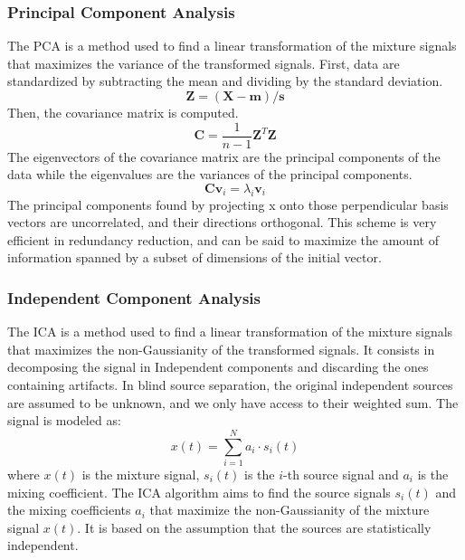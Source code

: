 \documentclass[a4paper]{sapthesis}
\begin{document}
\subsubsection{Principal Component Analysis}
The PCA\cite{pca} is a method used to find a linear transformation of the
mixture signals that maximizes the variance of the transformed signals. 
First, data are standardized by subtracting the mean and dividing by the
standard deviation.
\begin{equation}
\label{eq:pca}
\textbf{Z} = (\textbf{X} - \textbf{m})/\textbf{s}
\end{equation}
Then, the covariance matrix is computed. 
\begin{equation}
\label{eq:pca2}
\textbf{C} = \frac{1}{n-1}\textbf{Z}^T\textbf{Z}
\end{equation}
The eigenvectors of the covariance matrix are the principal components of the data while the
eigenvalues are the variances of the principal components.
\begin{equation}
\label{eq:pca3}
\textbf{C}\textbf{v}_i = \lambda_i\textbf{v}_i
\end{equation}
The principal components found by projecting x onto those
 perpendicular basis vectors are uncorrelated, and their directions 
 orthogonal. This scheme is very efficient in redundancy reduction,
  and can be said to maximize the amount of information spanned by a
subset of dimensions of the initial vector. \newline

\subsubsection{Independent Component Analysis}
The ICA\cite{ica} is a method used to find a linear transformation of the
mixture signals that maximizes the non-Gaussianity of the transformed signals.
It consists in decomposing the signal in Independent components and 
discarding the ones containing artifacts. In blind source separation, the original independent
sources are assumed to be unknown, and we only have
access to their weighted sum.\cite{ica2} \newline
The signal is modeled as:
\begin{equation}
\label{eq:ica}
x(t) = \sum_{i=1}^{N} a_i \cdot s_i(t)
\end{equation}
where $x(t)$ is the mixture signal, $s_i(t)$ is the $i$-th source signal
and $a_i$ is the mixing coefficient. \newline
The ICA algorithm aims to find the source signals $s_i(t)$ and the mixing
coefficients $a_i$ that maximize the non-Gaussianity of the mixture signal
$x(t)$. 
It is based on the assumption that the sources are statistically independent.
\newline
\end{document}
